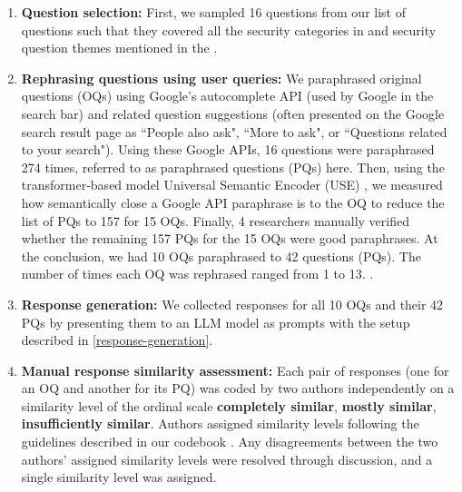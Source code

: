 \begin{enumerate}[wide, label={\bfseries \arabic*)}, left=0pt..0pt, itemindent=10pt]

    \item \textbf{Question selection:} First, we sampled 16 questions from our list of \questionsCollected questions such that they covered all the security categories in  and security question themes mentioned in the .
    
    \item \textbf{Rephrasing questions using user queries:} We paraphrased original questions (OQs) using Google's autocomplete API \cite{google-auto-complete-api} (used by Google in the search bar) and related question suggestions \cite{google-query-rec} (often presented on the Google search result page as “People also ask", “More to ask", or “Questions related to your search"). Using these Google APIs, 16 questions were paraphrased 274 times, referred to as paraphrased questions (PQs) here. Then, using the transformer-based model Universal Semantic Encoder (USE) \cite{tensorflow-USE}, we measured how semantically close a Google API paraphrase is to the OQ to reduce the list of PQs to 157 for 15 OQs. Finally, 4 researchers manually verified whether the remaining 157 PQs for the 15 OQs were good paraphrases. At the conclusion, we had 10 OQs paraphrased to 42 questions (PQs). The number of times each OQ was rephrased ranged from 1 to 13. . %
    
    
    \item \textbf{Response generation:} We collected responses for all 10 OQs and their 42 PQs by presenting them to an LLM model as prompts with the setup described in \ref{response-generation}.
    
    \item \textbf{Manual response similarity assessment:} Each pair of responses (one for an OQ and another for its PQ) was coded by two authors independently on a similarity level of the ordinal scale \textbf{completely similar}, \textbf{mostly similar}, \textbf{insufficiently similar}. Authors assigned similarity levels %
    following the guidelines described in our codebook \cite{codebook}. %
    Any disagreements between the two authors' assigned similarity levels were resolved through discussion, and a single similarity level was assigned.
    
\end{enumerate}

